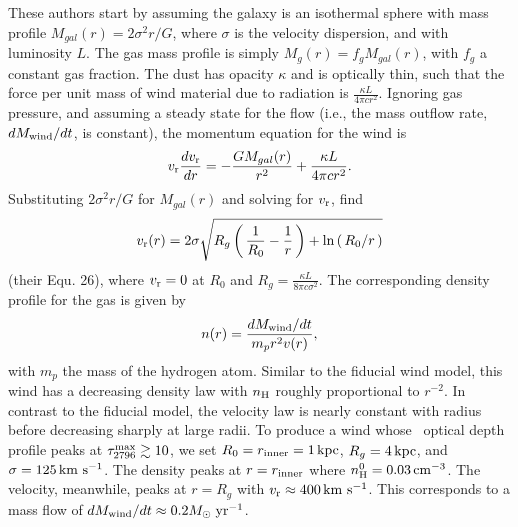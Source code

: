 \documentclass[12pt,preprint]{aastex}
\begin{document}
These authors start by assuming the galaxy is an isothermal sphere
with mass profile $M_{gal}(r) = 2\sigma^2r/G$, where $\sigma$ is the
velocity dispersion, and with luminosity $L$.  The gas mass profile is
simply $M_g(r) = f_g M_{gal}(r)$, with $f_g$ a constant gas fraction.  
The dust has opacity $\kappa$ and is optically thin, such that the force per unit mass of wind
material due to radiation is $\frac{\kappa L}{4\pi c r^2}$.
Ignoring gas pressure, and assuming a steady state for the flow (i.e.,
the mass outflow rate, $dM_{\rm wind}/dt$, is constant), the momentum
equation for the wind is 
\begin{equation}
v_{\rm r} \frac{dv_{\rm r}}{dr} = -\frac{GM_{gal}(r)}{r^2} + \frac{\kappa L}{4\pi c r^2}.
\end{equation}
Substituting $2\sigma^2 r/G$ for $M_{gal}(r)$ and solving for $v_{\rm r}$,
\citet{mqt05} find
\begin{equation}
v_{\rm r}(r) = 2\sigma \sqrt{R_g \left ( \, \frac{1}{R_0} - \frac{1}{r} \, \right )
   + \ln\left ( \, R_0/r \, \right ) }
\end{equation}
(their Equ. 26),
where $v_{\rm r} = 0$ at $R_0$ and $R_g = \frac{\kappa L}{8\pi c \sigma^2}$.
The corresponding density profile for the gas is given by
\begin{equation}
n(r) = \frac{dM_{\rm wind}/dt}{m_p r^2 v(r)}, 
\end{equation}
with $m_p$ the mass of the hydrogen atom.
Similar to the fiducial wind model, this wind has a decreasing density
law with $n_{\rm H}$ roughly proportional to $r^{-2}$. 
In contrast to the fiducial model, the velocity law is nearly
constant with radius before decreasing sharply at large radii.
To produce a wind whose \mgiia\ optical depth profile peaks at 
$\tau_{2796}^{\rm max} \gtrsim 10$, we set $R_0 = r_{\rm inner} =
1\,\rm kpc$, $R_g=4\,\rm kpc$, and $\sigma = 125 \, {\rm km~s^{-1}}$.  The density
peaks at $r=r_{\rm inner}$ where $n_{\rm H}^0 = 0.03
\, {\rm cm^{-3}}$.  The velocity, meanwhile, peaks at $r=R_g$ with $v_{\rm r}
\approx 400 \, {\rm km~s^{-1}}$.  This corresponds to a mass flow of
$dM_{\rm wind}/dt \approx 0.2 M_\odot\; \rm yr^{-1}$.  
\end{document}
